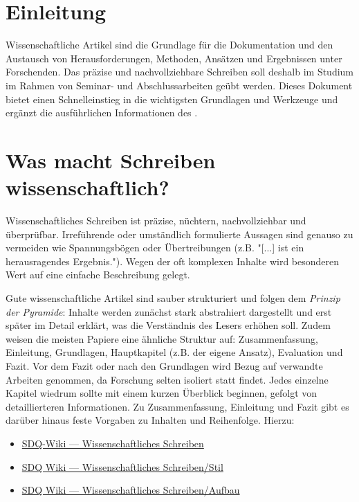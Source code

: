 \section{Einleitung}
\label{sec:Einleitung}

Wissenschaftliche Artikel sind die Grundlage für die Dokumentation und den Austausch von Herausforderungen, Methoden, Ansätzen und Ergebnissen unter Forschenden. Das präzise und nachvollziehbare Schreiben soll deshalb im Studium im Rahmen von Seminar- und Abschlussarbeiten geübt werden. Dieses Dokument bietet einen Schnelleinstieg in die wichtigsten Grundlagen und Werkzeuge und ergänzt die ausführlichen Informationen des .


\section{Was macht Schreiben wissenschaftlich?}
\label{sec:WissenschaftlichesSchreiben}

Wissenschaftliches Schreiben ist präzise, nüchtern, nachvollziehbar und überprüfbar. Irreführende oder umständlich formulierte Aussagen sind genauso zu vermeiden wie Spannungsbögen oder Übertreibungen (z.B. "[...] ist ein herausragendes Ergebnis."). Wegen der oft komplexen Inhalte wird besonderen Wert auf eine einfache Beschreibung gelegt.

Gute wissenschaftliche Artikel sind sauber strukturiert und folgen dem \emph{Prinzip der Pyramide}: Inhalte werden zunächst stark abstrahiert dargestellt und erst später im Detail erklärt, was die Verständnis des Lesers erhöhen soll. Zudem weisen die meisten Papiere eine ähnliche Struktur auf: Zusammenfassung, Einleitung, Grundlagen, Hauptkapitel (z.B. der eigene Ansatz), Evaluation und Fazit. Vor dem Fazit oder nach den Grundlagen wird Bezug auf verwandte Arbeiten genommen, da Forschung selten isoliert statt findet. Jedes einzelne Kapitel wiedrum sollte mit einem kurzen Überblick beginnen, gefolgt von detaillierteren Informationen. Zu Zusammenfassung, Einleitung und Fazit gibt es darüber hinaus feste Vorgaben zu Inhalten und Reihenfolge. Hierzu:

\smallskip

\begin{itemize}[label={\faInfoCircle}]
    \item \href{https://sdqweb.ipd.kit.edu/wiki/Wissenschaftliches_Schreiben}{SDQ-Wiki --- Wissenschaftliches Schreiben }
    \item \href{https://sdqweb.ipd.kit.edu/wiki/Wissenschaftliches_Schreiben/Stil}{SDQ Wiki --- Wissenschaftliches Schreiben/Stil}
    \item \href{https://sdqweb.ipd.kit.edu/wiki/Wissenschaftliches_Schreiben/Aufbau}{SDQ Wiki --- Wissenschaftliches Schreiben/Aufbau}
\end{itemize}


